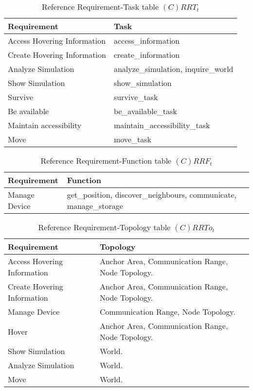 \begin{table}[H]
	\centering
	\begin{tabular}{|p{4cm}|p{8cm}|}
			\hline
			\textbf{Requirement} & \textbf{Task} \\
			\hline
			Access Hovering Information & access\_information \\
			\hline
			Create Hovering Information & create\_information \\
			\hline
			Analyze Simulation & analyze\_simulation, inquire\_world \\
			\hline
			Show Simulation & show\_simulation \\
			\hline
			Survive & survive\_task \\
			\hline
			Be available & be\_available\_task \\
			\hline
			Maintain accessibility & maintain\_accessibility\_task\\
			\hline
			Move & move\_task \\
			\hline
		\end{tabular}
	\caption{Reference Requirement-Task table $(C)RRT_t$}
	\label{tab:crrtt}
\end{table}

\begin{table}[H]
	\centering
	\begin{tabular}{|p{4cm}|p{8cm}|}
			\hline
			\textbf{Requirement} & \textbf{Function} \\
			\hline
			Manage Device & get\_position, discover\_neighbours, communicate, manage\_storage \\
			\hline
		\end{tabular}
	\caption{Reference Requirement-Function table $(C)RRF_t$}
	\label{tab:crrft}
\end{table}

\begin{table}[H]
	\centering
	\begin{tabular}{|p{4cm}|p{8cm}|}
			\hline
			\textbf{Requirement} & \textbf{Topology} \\
			\hline
			Access Hovering Information & Anchor Area, Communication Range, Node Topology. \\
			\hline
			Create Hovering Information & Anchor Area, Communication Range, Node Topology. \\
			\hline
			Manage Device & Communication Range, Node Topology. \\
			\hline
			Hover & Anchor Area, Communication Range, Node Topology. \\
			\hline
			Show Simulation & World. \\
			\hline
			Analyze Simulation & World. \\
			\hline
			Move & World. \\
			\hline
		\end{tabular}
	\caption{Reference Requirement-Topology table $(C)RRTo_t$}
	\label{tab:crrtot}
\end{table}

